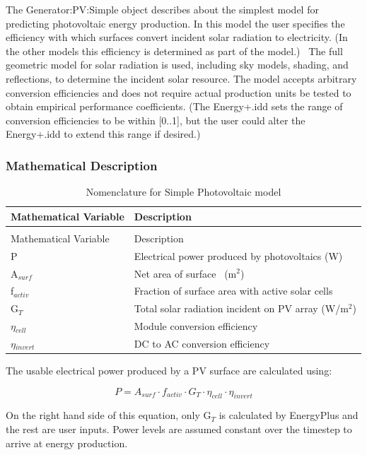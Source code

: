 The Generator:PV:Simple object describes about the simplest model for predicting photovoltaic energy production. In this model the user specifies the efficiency with which surfaces convert incident solar radiation to electricity. (In the other models this efficiency is determined as part of the model.)~ The full geometric model for solar radiation is used, including sky models, shading, and reflections, to determine the incident solar resource. The model accepts arbitrary conversion efficiencies and does not require actual production units be tested to obtain empirical performance coefficients. (The Energy+.idd sets the range of conversion efficiencies to be within {[}0..1{]}, but the user could alter the Energy+.idd to extend this range if desired.)

\subsubsection{Mathematical Description}\label{mathematical-description}

\begin{longtable}[l]{p{1.2in}p{4.8in}}
\caption{Nomenclature for Simple Photovoltaic model \label{table:nomenclature-for-simple-photovoltaic-model}} \tabularnewline
\toprule 
Mathematical Variable & Description \tabularnewline
\midrule
\endfirsthead

\caption[]{Nomenclature for Simple Photovoltaic model} \tabularnewline
\toprule 
Mathematical Variable & Description \tabularnewline
\midrule
\endhead

P & Electrical power produced by photovoltaics (W) \tabularnewline
A\(_{surf}\) & Net area of surface~ (m\(^{2}\)) \tabularnewline
f\(_{activ}\) & Fraction of surface area with active solar cells \tabularnewline
G\(_{T}\) & Total solar radiation incident on PV array (W/m\(^{2}\)) \tabularnewline
$\eta$\(_{cell}\) & Module conversion efficiency \tabularnewline
$\eta$\(_{invert}\) & DC to AC conversion efficiency \tabularnewline
\bottomrule
\end{longtable}

The usable electrical power produced by a PV surface are calculated using:

\begin{equation}
P = {A_{surf}} \cdot {f_{activ}} \cdot {G_T} \cdot {\eta_{cell}} \cdot {\eta_{invert}}
\end{equation}

On the right hand side of this equation, only G\(_{T}\) is calculated by EnergyPlus and the rest are user inputs. Power levels are assumed constant over the timestep to arrive at energy production.

